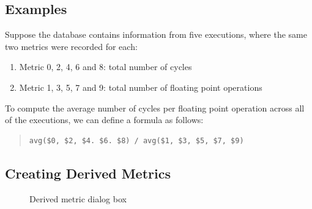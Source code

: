 
\subsection{Examples}

Suppose the database contains information from five executions, where the same two metrics were recorded for each:
\begin{enumerate}
\item Metric 0, 2, 4, 6 and 8: total number of cycles
\item Metric 1, 3, 5, 7 and 9: total number of floating point operations
\end{enumerate}
To compute the average number of cycles per floating point operation across all of the executions, we can define a formula as follows:
\begin{quote}
\begin{verbatim}
avg($0, $2, $4. $6. $8) / avg($1, $3, $5, $7, $9)
\end{verbatim}
\end{quote}


\subsection{Creating Derived Metrics}

\begin{figure}[t]
\caption{Derived metric dialog box}
\label{fig:hpcviewer-derived-dialog-box}
\end{figure}

